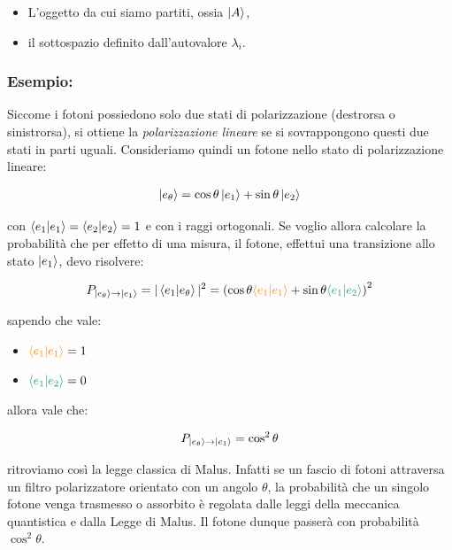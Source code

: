 \begin{itemize}
	\item L'oggetto da cui siamo partiti, ossia $\ket{A}$,
	\item il sottospazio definito dall'autovalore $\lambda_i$.
\end{itemize}


\subsubsection{Esempio:}

	Siccome i fotoni possiedono solo due stati di polarizzazione (destrorsa o sinistrorsa), si ottiene la \textit{polarizzazione lineare} se si sovrappongono questi due stati in parti uguali. Consideriamo quindi un fotone nello stato di polarizzazione lineare:
	
\begin{align*}
	\ket{e_{\theta}} = \cos\theta \ket{e_1} + \sin\theta \ket{e_2}
\end{align*}

	con $\braket{e_1} = \braket{e_2} = 1$ e con i raggi ortogonali. Se voglio allora calcolare la probabilità che per effetto di una misura, il fotone, effettui una transizione allo stato $\ket{e_1}$, devo risolvere:
	
\begin{align*}
	P_{\ket{e_{\theta}} \to \ket{e_1} } = |\braket{e_1}{e_{\theta}}|^2 = \qty( \cos\theta \textcolor{orange}{\braket{e_1}} + \sin\theta \textcolor{ForestGreen}{ \braket{e_1}{e_2}} )^2 
\end{align*}

	sapendo che vale:
	
\begin{itemize}
	\item $\textcolor{orange}{\braket{e_1}} = 1$
	\item $\textcolor{ForestGreen}{ \braket{e_1}{e_2}} = 0$
\end{itemize}

	allora vale che:
	
\begin{nb}	
\begin{align*}
	P_{\ket{e_{\theta}} \to \ket{e_1} }  = \cos^2\theta
\end{align*}
\end{nb}
	
	ritroviamo così la legge classica di Malus.  Infatti se un fascio di fotoni attraversa un filtro polarizzatore orientato con un angolo $\theta$, la probabilità che un singolo fotone venga trasmesso o assorbito è regolata dalle leggi della meccanica quantistica e dalla Legge di Malus. Il fotone dunque passerà con probabilità $\cos^2\theta$.

